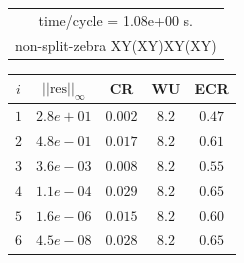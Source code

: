 \begin{table}[hbt]
\begin{center}
{\begin{tabular}{|c|c|c|c|c|}
\multicolumn{5}{|c|}{time/cycle = 1.08e+00 s.}  \\
\multicolumn{5}{|c|}{non-split-zebra XY(XY)XY(XY)}  \\
\hline 
\end{tabular}
\begin{tabular}{|c|c|c|c|c|} \hline 
 $i$   & $\vert\vert\mbox{res}\vert\vert_\infty$  &  CR     &  WU    & ECR  \\   \hline 
 $ 1$  & $ 2.8e+01$ & $0.002$ & $ 8.2$ & $0.47$ \\ 
 $ 2$  & $ 4.8e-01$ & $0.017$ & $ 8.2$ & $0.61$ \\ 
 $ 3$  & $ 3.6e-03$ & $0.008$ & $ 8.2$ & $0.55$ \\ 
 $ 4$  & $ 1.1e-04$ & $0.029$ & $ 8.2$ & $0.65$ \\ 
 $ 5$  & $ 1.6e-06$ & $0.015$ & $ 8.2$ & $0.60$ \\ 
 $ 6$  & $ 4.5e-08$ & $0.028$ & $ 8.2$ & $0.65$ \\ 

\end{tabular}}
\end{center}
\end{table}
